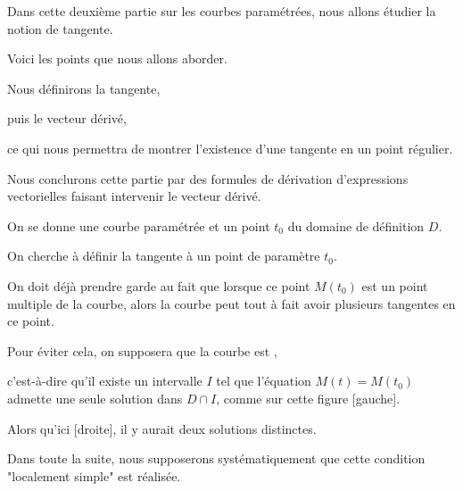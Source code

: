 






\debuttexte


\diapo

Dans cette deuxième partie sur les courbes paramétrées, 
nous allons étudier la notion de tangente.

\change

Voici les points que nous allons aborder.

\change

Nous définirons la tangente,

\change

puis le vecteur dérivé,

\change 

ce qui nous permettra de montrer l'existence d'une tangente en un point régulier.

\change

Nous conclurons cette partie par des formules 
de dérivation d'expressions vectorielles faisant intervenir le vecteur dérivé.


\diapo

On se donne une courbe paramétrée et un point $t_0$ du domaine de définition $D$. 

\change
On cherche à définir la tangente à un point de paramètre $t_0$.

\change

On doit déjà prendre garde au fait que lorsque ce point $M(t_0)$ 
est un point multiple de la courbe, alors la courbe peut 
tout à fait avoir plusieurs tangentes en ce point.

\change

Pour éviter cela, on supposera que la courbe est  , 

\change
c'est-à-dire qu'il existe un intervalle 
 $I$ tel que l'équation $M(t)=M(t_0)$ 
admette une seule solution dans $D\cap I$, comme sur cette figure [gauche].  

Alors qu'ici [droite], il y aurait deux solutions distinctes.


Dans toute la suite, nous supposerons 
systématiquement que cette condition "localement simple" est réalisée.



